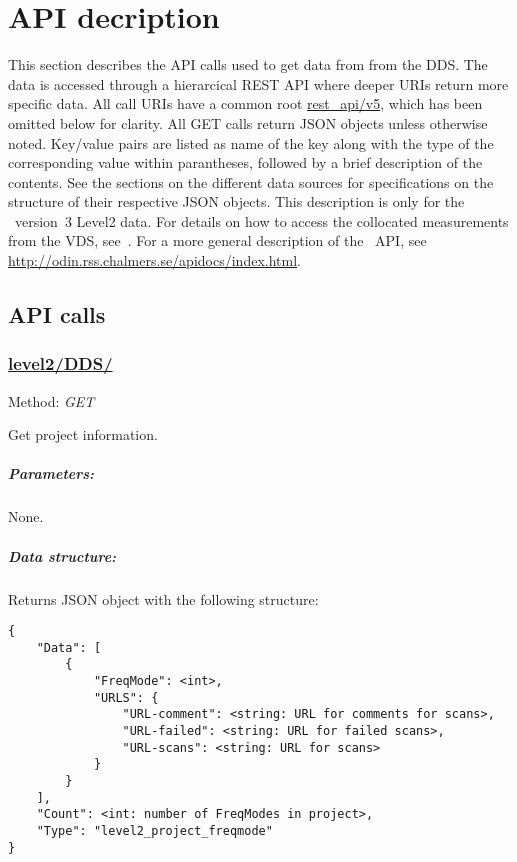 \chapter{API decription}
\label{chapter:api}
This section describes the API calls used to get data from from the DDS.  The
data is accessed through a hierarcical REST API where deeper URIs return more
specific data.  All call URIs have a common root \url{rest_api/v5}, which
has been omitted below for clarity.  All GET calls return JSON objects unless
otherwise noted. Key/value pairs are listed as name of the key
along with the type of the corresponding value within parantheses, followed
by a brief description of the contents.  See the sections on the different
data sources for specifications on the structure of their respective JSON
objects. This description is only for the \smr~version~3 Level2 data. For
details on how to access the collocated measurements from the VDS,
see~\cite{VDS:2016}. For a more general description of the \smr~API, see
\url{http://odin.rss.chalmers.se/apidocs/index.html}.



\section{API calls}
\subsection{\url{level2/DDS/}}
Method: \emph{GET}

Get project information.

\paragraph{Parameters:} None.

\paragraph{Data structure:}
Returns JSON object with the following structure:

\begin{lstlisting}
{
 	"Data": [
    	{
      		"FreqMode": <int>,
			"URLS": {
				"URL-comment": <string: URL for comments for scans>,
				"URL-failed": <string: URL for failed scans>,
				"URL-scans": <string: URL for scans>
			}
		}
	],
	"Count": <int: number of FreqModes in project>,
	"Type": "level2_project_freqmode"
}
\end{lstlisting}


